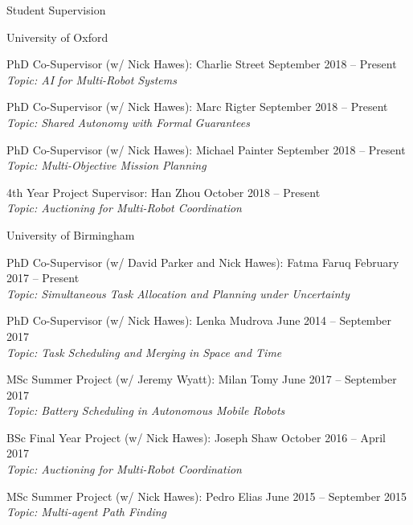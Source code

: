 
\begin{rSection}{Student Supervision}

\begin{rSubsection}{University of Oxford}{}{}{}
\item PhD Co-Supervisor (w/ Nick Hawes): Charlie Street \hfill September 2018 -- Present\\
\textit{Topic: AI for Multi-Robot Systems}

\item PhD Co-Supervisor (w/ Nick Hawes): Marc Rigter \hfill September 2018 -- Present\\
\textit{Topic: Shared Autonomy with Formal Guarantees}

\item PhD Co-Supervisor (w/ Nick Hawes): Michael Painter \hfill September 2018 -- Present\\
\textit{Topic: Multi-Objective Mission Planning}

\item 4th Year Project Supervisor: Han Zhou \hfill October 2018 -- Present\\
\textit{Topic: Auctioning for Multi-Robot Coordination}
\end{rSubsection}

\begin{rSubsection}{University of Birmingham}{}{}{}
\item PhD Co-Supervisor (w/ David Parker and Nick Hawes): Fatma Faruq \hfill February 2017 -- Present\\
\textit{Topic: Simultaneous Task Allocation and Planning under Uncertainty}

\item PhD Co-Supervisor (w/ Nick Hawes):  Lenka Mudrova \hfill June 2014 -- September 2017\\
\textit{Topic: Task Scheduling and Merging in Space and Time}

\item MSc Summer Project (w/ Jeremy Wyatt): Milan Tomy \hfill June 2017 -- September 2017\\
\textit{Topic: Battery Scheduling in Autonomous Mobile Robots}

\item BSc Final Year Project (w/ Nick Hawes): Joseph Shaw \hfill October 2016 -- April 2017\\
\textit{Topic: Auctioning for Multi-Robot Coordination}

\item MSc Summer Project (w/ Nick Hawes): Pedro Elias \hfill June 2015 -- September 2015\\
\textit{Topic: Multi-agent Path Finding}


\end{rSubsection}
\end{rSection}
